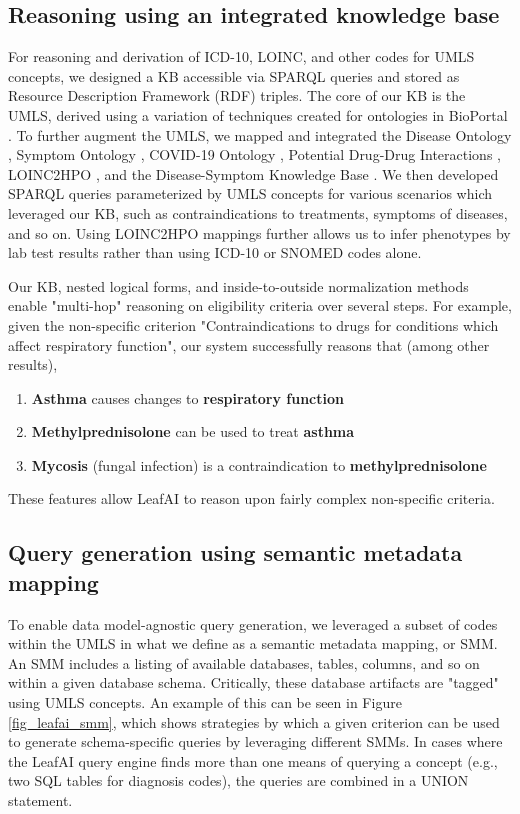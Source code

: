\documentclass[../main.tex]{subfiles}
\begin{document}
\subsection{Reasoning using an integrated knowledge base}

For reasoning and derivation of ICD-10, LOINC, and other codes for UMLS concepts, we designed a KB accessible via SPARQL queries and stored as Resource Description Framework (RDF) \cite{manola2004rdf} triples. The core of our KB is the UMLS, derived using a variation of techniques created for ontologies in BioPortal \cite{noy2009bioportal}. To further augment the UMLS, we mapped and integrated the Disease Ontology \cite{schriml2012disease}, Symptom Ontology \cite{sayers2010database}, COVID-19 Ontology \cite{sargsyan2020covid}, Potential Drug-Drug Interactions \cite{ayvaz2015toward}, LOINC2HPO \cite{zhang2019semantic}, and the Disease-Symptom Knowledge Base \cite{wang2008automated}. We then developed SPARQL queries parameterized by UMLS concepts for various scenarios which leveraged our KB, such as contraindications to treatments, symptoms of diseases, and so on. Using LOINC2HPO mappings further allows us to infer phenotypes by lab test results rather than using ICD-10 or SNOMED codes alone. 

Our KB, nested logical forms, and inside-to-outside normalization methods enable "multi-hop" reasoning on eligibility criteria over several steps. For example, given the non-specific criterion "Contraindications to drugs for conditions which affect respiratory function", our system successfully reasons that (among other results),

\begin{enumerate}
    \item \textbf{Asthma} causes changes to \textbf{respiratory function}
    \item \textbf{Methylprednisolone} can be used to treat \textbf{asthma}
    \item \textbf{Mycosis} (fungal infection) is a contraindication to \textbf{methylprednisolone}
\end{enumerate}

\noindent These features allow LeafAI to reason upon fairly complex non-specific criteria.

\subsection{Query generation using semantic metadata mapping}

To enable data model-agnostic query generation, we leveraged a subset of codes within the UMLS in what we define as a semantic metadata mapping, or SMM. An SMM includes a listing of available databases, tables, columns, and so on within a given database schema. Critically, these database artifacts are "tagged" using UMLS concepts. An example of this can be seen in Figure \ref{fig_leafai_smm}, which shows strategies by which a given criterion can be used to generate schema-specific queries by leveraging different SMMs. In cases where the LeafAI query engine finds more than one means of querying a concept (e.g., two SQL tables for diagnosis codes), the queries are combined in a UNION statement.
\end{document}
